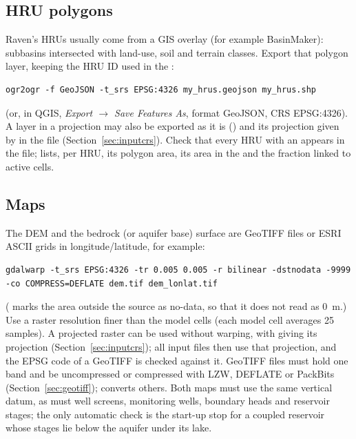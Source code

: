 \subsection{HRU polygons}
Raven's HRUs usually come from a GIS overlay (for example BasinMaker): subbasins intersected with land-use, soil and terrain
classes. Export that polygon layer, keeping the HRU ID used in the :
\par\noindent\begin{minipage}{\linewidth}
\begin{lstlisting}
ogr2ogr -f GeoJSON -t_srs EPSG:4326 my_hrus.geojson my_hrus.shp
\end{lstlisting}
\end{minipage}\par\smallskip
(or, in QGIS, \emph{Export $\rightarrow$ Save Features As}, format GeoJSON, CRS EPSG:4326). A layer in a projection may also be
exported as it is () and its projection given by  in the
 file (Section~\ref{sec:inputcrs}). Check that every HRU with an
 appears in the file;  lists, per HRU, its polygon area, its area in the 
and the fraction linked to active cells.
\subsection{Maps}
The DEM and the bedrock (or aquifer base) surface are GeoTIFF files or ESRI ASCII grids in longitude/latitude, for
example:
\par\noindent\begin{minipage}{\linewidth}
\begin{lstlisting}
gdalwarp -t_srs EPSG:4326 -tr 0.005 0.005 -r bilinear -dstnodata -9999 -co COMPRESS=DEFLATE dem.tif dem_lonlat.tif
\end{lstlisting}
\end{minipage}\par\smallskip
( marks the area outside the source as no-data, so that it does not read as 0~m.) Use a raster resolution finer than the model cells (each model cell averages 25 samples). A projected raster can be used
without warping, with  giving its projection (Section~\ref{sec:inputcrs}); all input files then use that
projection, and the EPSG code of a GeoTIFF is checked against it. GeoTIFF files must hold one band and be uncompressed or
compressed with LZW, DEFLATE or PackBits (Section~\ref{sec:geotiff}); 
converts others. Both maps must use the same vertical datum, as must
well screens, monitoring wells, boundary heads and reservoir stages; the only automatic check is the start-up stop for a
coupled reservoir whose stages lie below the aquifer under its lake.
